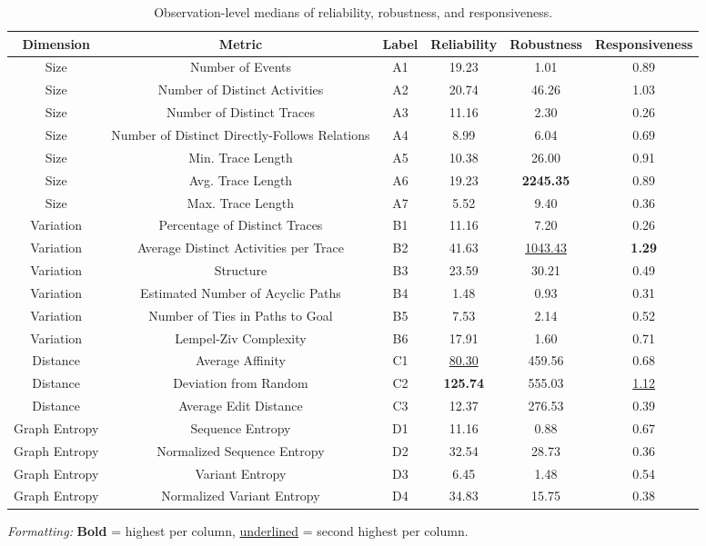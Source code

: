 \begin{table}[H]
\centering
\scriptsize
\caption{Observation-level medians of reliability, robustness, and responsiveness.}
\label{tab:median-across-all-obs}
\setlength{\tabcolsep}{2pt}  %
\begin{tabular}{cccccc}
\toprule
    Dimension &                                        Metric & Label &  Reliability &  Robustness &  Responsiveness \\
\midrule
Size & Number of Events & A1 & 19.23 & 1.01 & 0.89 \\
Size & Number of Distinct Activities & A2 & 20.74 & 46.26 & 1.03 \\
Size & Number of Distinct Traces & A3 & 11.16 & 2.30 & 0.26 \\
Size & Number of Distinct Directly-Follows Relations & A4 & 8.99 & 6.04 & 0.69 \\
Size & Min. Trace Length & A5 & 10.38 & 26.00 & 0.91 \\
Size & Avg. Trace Length & A6 & 19.23 & \textbf{2245.35} & 0.89 \\
Size & Max. Trace Length & A7 & 5.52 & 9.40 & 0.36 \\
Variation & Percentage of Distinct Traces & B1 & 11.16 & 7.20 & 0.26 \\
Variation & Average Distinct Activities per Trace & B2 & 41.63 & \underline{1043.43} & \textbf{1.29} \\
Variation & Structure & B3 & 23.59 & 30.21 & 0.49 \\
Variation & Estimated Number of Acyclic Paths & B4 & 1.48 & 0.93 & 0.31 \\
Variation & Number of Ties in Paths to Goal & B5 & 7.53 & 2.14 & 0.52 \\
Variation & Lempel-Ziv Complexity & B6 & 17.91 & 1.60 & 0.71 \\
Distance & Average Affinity & C1 & \underline{80.30} & 459.56 & 0.68 \\
Distance & Deviation from Random & C2 & \textbf{125.74} & 555.03 & \underline{1.12} \\
Distance & Average Edit Distance & C3 & 12.37 & 276.53 & 0.39 \\
Graph Entropy & Sequence Entropy & D1 & 11.16 & 0.88 & 0.67 \\
Graph Entropy & Normalized Sequence Entropy & D2 & 32.54 & 28.73 & 0.36 \\
Graph Entropy & Variant Entropy & D3 & 6.45 & 1.48 & 0.54 \\
Graph Entropy & Normalized Variant Entropy & D4 & 34.83 & 15.75 & 0.38 \\
\bottomrule
\end{tabular}
\vspace{2pt}
\begin{minipage}{\linewidth}
\centering
\scriptsize
\tiny
\textit{Formatting:} \textbf{Bold} = highest per column, \underline{underlined} = second highest per column.
\end{minipage}
\end{table}
